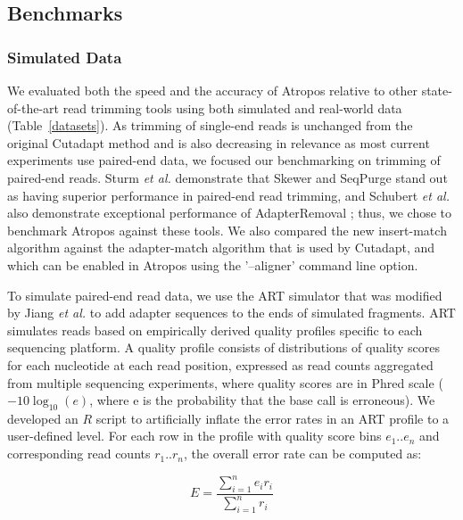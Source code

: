 \documentclass[fleqn,10pt,lineno]{wlpeerj} %
\begin{document}
\subsection{Benchmarks}

\subsubsection{Simulated Data}



We evaluated both the speed and the accuracy of Atropos relative to other state-of-the-art read trimming tools using both simulated and real-world data (Table~\ref{datasets}). As trimming of single-end reads is unchanged from the original Cutadapt method and is also decreasing in relevance as most current experiments use paired-end data, we focused our benchmarking on trimming of paired-end reads. Sturm \textit{et al.} demonstrate that Skewer \citep{jiang_skewer:_2014} and SeqPurge \citep{sturm_seqpurge:_2016} stand out as having superior performance in paired-end read trimming, and Schubert \textit{et al.} also demonstrate exceptional performance of AdapterRemoval \citep{schubert_adapterremoval_2016}; thus, we chose to benchmark Atropos against these tools. We also compared the new insert-match algorithm against the adapter-match algorithm that is used by Cutadapt, and which can be enabled in Atropos using the '--aligner' command line option.

To simulate paired-end read data, we use the ART simulator \citep{huang_art:_2012} that was modified by Jiang \textit{et al.} to add adapter sequences to the ends of simulated fragments. ART simulates reads based on empirically derived quality profiles specific to each sequencing platform. A quality profile consists of distributions of quality scores for each nucleotide at each read position, expressed as read counts aggregated from multiple sequencing experiments, where quality scores are in Phred scale ($-10 \log_{10}(e)$, where e is the probability that the base call is erroneous). We developed an $R$ script to artificially inflate the error rates in an ART profile to a user-defined level. For each row in the profile with quality score bins $e_{1}..e_{n}$ and corresponding read counts $r_{1}..r_{n}$, the overall error rate can be computed as:

\begin{equation}
E = \frac{\sum_{i=1}^{n} e_{i}r_{i}}{\sum_{i=1}^{n} r_{i}}
\label{eq:error}
\end{equation}
\end{document}
